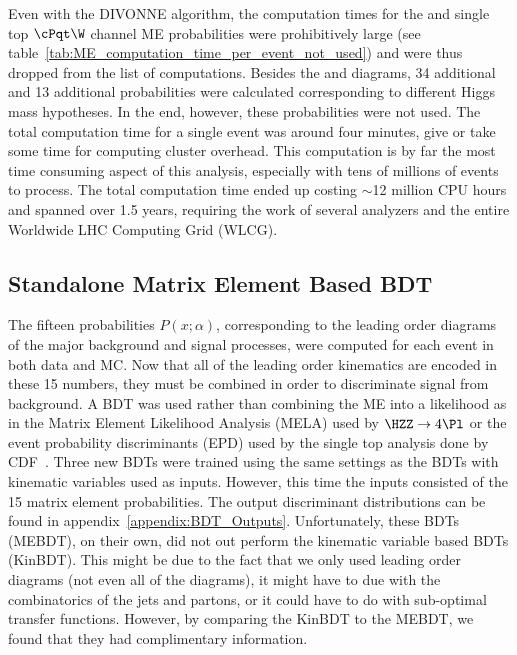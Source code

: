 Even with the DIVONNE algorithm, the computation times for the \ttbar and single top $\cPqt\W$ channel ME probabilities were prohibitively large (see table~\ref{tab:ME_computation_time_per_event_not_used}) and were thus dropped from the list of computations.
Besides the \joinsym{\MH}{=}{125\gev} \ggH and \WH diagrams, 34 additional \ggH and 13 additional \WH probabilities were calculated corresponding to different Higgs mass hypotheses.
In the end, however, these probabilities were not used.
The total computation time for a single event was around four minutes, give or take some time for computing cluster overhead.
This computation is by far the most time consuming aspect of this analysis, especially with tens of millions of events to process.
The total computation time ended up costing $\sim$12 million CPU hours and spanned over 1.5 years, requiring the work of several analyzers and the entire Worldwide LHC Computing Grid (WLCG).

\subsection{Standalone Matrix Element Based BDT}

The fifteen probabilities $P(x;\alpha)$, corresponding to the leading order diagrams of the major background and signal processes, were computed for each event in both data and MC.
Now that all of the leading order kinematics are encoded in these 15 numbers, they must be combined in order to discriminate signal from background.
A BDT was used rather than combining the ME into a likelihood as in the Matrix Element Likelihood Analysis (MELA) used by $\HZZ\rightarrow\text{4}\Pl$ or the event probability discriminants (EPD) used by the single top analysis done by CDF~\cite{Dong2008}.
Three new BDTs were trained using the same settings as the BDTs with kinematic variables used as inputs.
However, this time the inputs consisted of the 15 matrix element probabilities.
The output discriminant distributions can be found in appendix~\ref{appendix:BDT_Outputs}.
Unfortunately, these BDTs (MEBDT), on their own, did not out perform the kinematic variable based BDTs (KinBDT).
This might be due to the fact that we only used leading order diagrams (not even all of the diagrams), it might have to due with the combinatorics of the jets and partons, or it could have to do with sub-optimal transfer functions.
However, by comparing the KinBDT to the MEBDT, we found that they had complimentary information.

